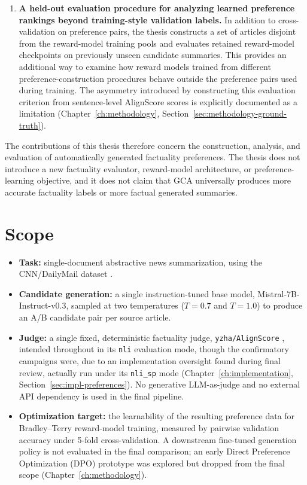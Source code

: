 \begin{enumerate}
  \item \textbf{A held-out evaluation procedure for analyzing learned
    preference rankings beyond training-style validation labels.} In addition
    to cross-validation on preference pairs, the thesis constructs a set of
    articles disjoint from the reward-model training pools and evaluates
    retained reward-model checkpoints on previously unseen candidate
    summaries. This provides an additional way to examine how reward models
    trained from different preference-construction procedures behave outside
    the preference pairs used during training. The asymmetry introduced by
    constructing this evaluation criterion from sentence-level AlignScore
    scores is explicitly documented as a limitation
    (Chapter~\ref{ch:methodology}, Section~\ref{sec:methodology-ground-truth}).
\end{enumerate}

The contributions of this thesis therefore concern the construction,
analysis, and evaluation of automatically generated factuality preferences.
The thesis does not introduce a new factuality evaluator, reward-model
architecture, or preference-learning objective, and it does not claim that
GCA universally produces more accurate factuality labels or more factual
generated summaries.

\section{Scope}
\label{sec:intro-scope}

\begin{itemize}
  \item \textbf{Task:} single-document abstractive news summarization, using the
    CNN/DailyMail dataset \citep{hermann2015teaching, nallapati2016abstractive}.
  \item \textbf{Candidate generation:} a single instruction-tuned base model,
    Mistral-7B-Instruct-v0.3, sampled at two temperatures ($T=0.7$ and $T=1.0$) to
    produce an A/B candidate pair per source article.
  \item \textbf{Judge:} a single fixed, deterministic factuality judge,
    \texttt{yzha/AlignScore} \citep{zha2023alignscore}, intended throughout
    in its \texttt{nli} evaluation mode, though the confirmatory campaigns
    were, due to an implementation oversight found during final review,
    actually run under its \texttt{nli\_sp} mode
    (Chapter~\ref{ch:implementation}, Section~\ref{sec:impl-preferences}).
    No generative LLM-as-judge and no external API dependency is
    used in the final pipeline.
  \item \textbf{Optimization target:} the learnability of the resulting preference
    data for Bradley--Terry reward-model training, measured by pairwise validation
    accuracy under 5-fold cross-validation. A downstream fine-tuned generation
    policy is not evaluated in the final comparison; an early Direct Preference
    Optimization (DPO) prototype was explored but dropped from the final scope
    (Chapter~\ref{ch:methodology}).
\end{itemize}

